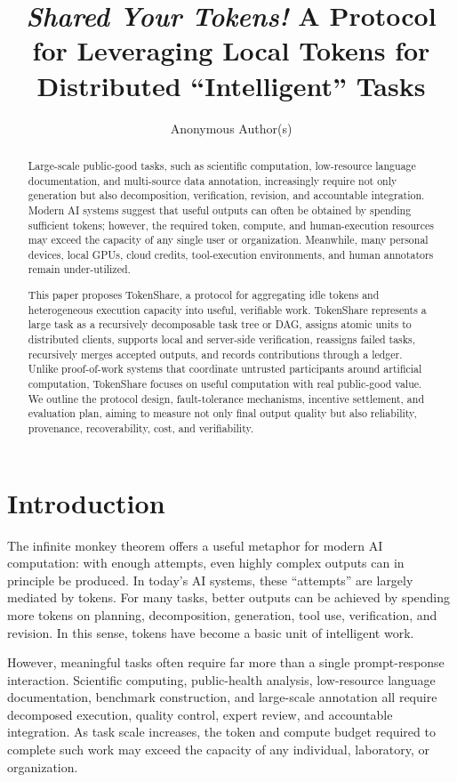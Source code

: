 \documentclass{article}
\title{\textit{Shared Your Tokens!}  A Protocol for Leveraging Local Tokens  for  Distributed ``Intelligent'' Tasks}
\author{Anonymous Author(s)}
\theoremstyle{plain}
\begin{document}
\maketitle

\begin{abstract}
Large-scale public-good tasks, such as scientific computation, low-resource language documentation, and multi-source data annotation, increasingly require not only generation but also decomposition, verification, revision, and accountable integration. Modern AI systems suggest that useful outputs can often be obtained by spending sufficient tokens; however, the required token, compute, and human-execution resources may exceed the capacity of any single user or organization. Meanwhile, many personal devices, local GPUs, cloud credits, tool-execution environments, and human annotators remain under-utilized.

This paper proposes TokenShare, a protocol for aggregating idle tokens and heterogeneous execution capacity into useful, verifiable work. TokenShare represents a large task as a recursively decomposable task tree or DAG, assigns atomic units to distributed clients, supports local and server-side verification, reassigns failed tasks, recursively merges accepted outputs, and records contributions through a ledger. Unlike proof-of-work systems that coordinate untrusted participants around artificial computation, TokenShare focuses on useful computation with real public-good value. We outline the protocol design, fault-tolerance mechanisms, incentive settlement, and evaluation plan, aiming to measure not only final output quality but also reliability, provenance, recoverability, cost, and verifiability.
\end{abstract}

\section{Introduction}

The infinite monkey theorem offers a useful metaphor for modern AI computation: with enough attempts, even highly complex outputs can in principle be produced. In today’s AI systems, these “attempts” are largely mediated by tokens. For many tasks, better outputs can be achieved by spending more tokens on planning, decomposition, generation, tool use, verification, and revision. In this sense, tokens have become a basic unit of intelligent work.

However, meaningful tasks often require far more than a single prompt-response interaction. Scientific computing, public-health analysis, low-resource language documentation, benchmark construction, and large-scale annotation all require decomposed execution, quality control, expert review, and accountable integration. As task scale increases, the token and compute budget required to complete such work may exceed the capacity of any individual, laboratory, or organization.
\end{document}
